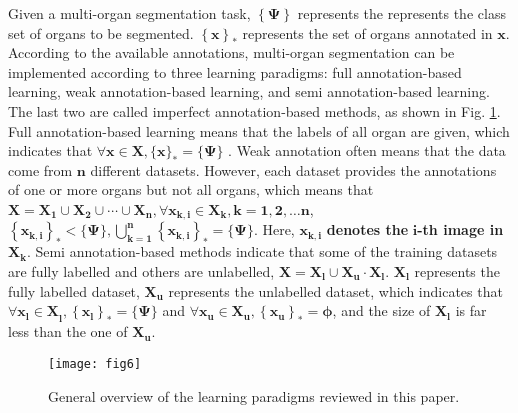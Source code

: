 \documentclass[lettersize,journal]{IEEEtran}
\begin{document}
Given a multi-organ segmentation task, $\left\{\boldsymbol{\Psi}\right\}$ represents the represents the class set of organs to be segmented. $\left\{\boldsymbol{x}\right\}_\ast$ represents the set of organs annotated in $\boldsymbol{x}$. According to the available annotations, multi-organ segmentation can be implemented according to three learning paradigms: full annotation-based learning, weak annotation-based learning, and semi annotation-based learning. The last two are called imperfect annotation-based methods, as shown in Fig. \ref{fig6}. Full annotation-based learning means that the labels of all organ are given, which indicates that $\forall \boldsymbol{x} \in \boldsymbol{X},\{\boldsymbol{x}\}_*=\{\boldsymbol{\Psi}\}$ . Weak annotation often means that the data come from $\boldsymbol{n}$ different datasets. However, each dataset provides the annotations of one or more organs but not all organs, which means that $\boldsymbol{X=X_1 \cup X_2 \cup \cdots \cup X_n, \forall x_{k, i} \in X_k, k=1,2, \ldots n}$, $\boldsymbol{\left\{x_{k, i}\right\}_*<\{\Psi\}, \bigcup_{k=1}^n\left\{x_{k, i}\right\}_*=\{\Psi\}}$. Here, $\boldsymbol{x_{k, i}}$ \textbf{denotes the} $\boldsymbol{i}$\textbf{-th image in} $\boldsymbol{X_k}$. Semi annotation-based methods indicate that some of the training datasets are fully labelled and others are unlabelled, $\boldsymbol{X}=\boldsymbol{X}_{\boldsymbol{l}} \cup \boldsymbol{X_u} \cdot \boldsymbol{X}_{\boldsymbol{l}}$. $\boldsymbol{X_l}$ represents the fully labelled dataset, $\boldsymbol{X_u}$ represents the unlabelled dataset, which indicates that $\forall \boldsymbol{x_l \in X}_{\boldsymbol{l}},\left\{\boldsymbol{x}_{\boldsymbol{l}}\right\}_*=\{\boldsymbol{\Psi}\}$ and $\forall \boldsymbol{x}_{\boldsymbol{u}} \in \boldsymbol{X}_{\boldsymbol{u}},\left\{\boldsymbol{x}_{\boldsymbol{u}}\right\}_*=\boldsymbol{\phi}$, and the size of $\boldsymbol{X_l}$ is far less than the one of $\boldsymbol{X_u}$.
\begin{figure}[ht!]
    \centering
    \texttt{[image: fig6]}
    \caption{General overview of the learning paradigms reviewed in this paper.}
    \label{fig6}
\end{figure}
\end{document}
